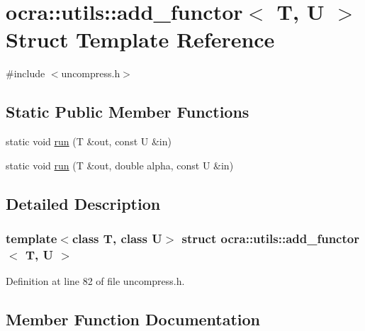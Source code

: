 \hypertarget{structocra_1_1utils_1_1add__functor}{}\section{ocra\+:\+:utils\+:\+:add\+\_\+functor$<$ T, U $>$ Struct Template Reference}
\label{structocra_1_1utils_1_1add__functor}


{\ttfamily \#include $<$uncompress.\+h$>$}

\subsection*{Static Public Member Functions}
\begin{DoxyCompactItemize}
\item 
static void \hyperlink{structocra_1_1utils_1_1add__functor_ae1b1954f668a3db199cd696da004e661}{run} (T \&out, const U \&in)
\item 
static void \hyperlink{structocra_1_1utils_1_1add__functor_a1a9206cb5192b4a1314d5e93afef9c27}{run} (T \&out, double alpha, const U \&in)
\end{DoxyCompactItemize}


\subsection{Detailed Description}
\subsubsection*{template$<$class T, class U$>$\newline
struct ocra\+::utils\+::add\+\_\+functor$<$ T, U $>$}



Definition at line 82 of file uncompress.\+h.



\subsection{Member Function Documentation}
\hypertarget{structocra_1_1utils_1_1add__functor_ae1b1954f668a3db199cd696da004e661}{}\label{structocra_1_1utils_1_1add__functor_ae1b1954f668a3db199cd696da004e661} 
